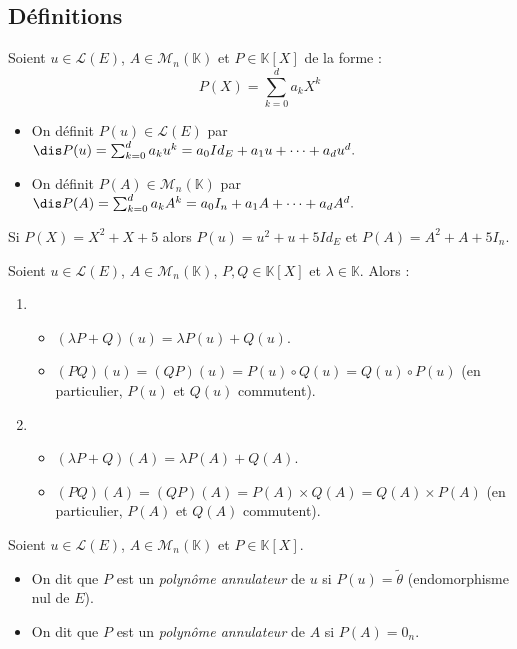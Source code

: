 \documentclass[a4paper,10pt]{report}
\begin{document}
\subsection{Définitions}

\begin{defin} Soient $u \in \mathcal{L}(E)$, $A \in \mathcal{M}_n(\mathbb{K})$ et $P \in \mathbb{K}[X]$ de la forme :
$$ P(X) = \sum_{k=0}^d a_k X^k $$
\begin{itemize}
\item On définit $P(u) \in \mathcal{L}(E)$ par $\dis P(u) = \sum_{k=0}^d a_k u^k = a_0 Id_E + a_1 u + \cdots +a_d u^d.$
\item On définit $P(A) \in \mathcal{M}_n(\mathbb{K})$ par $\dis P(A) = \sum_{k=0}^d a_k A^k = a_0 I_n + a_1 A + \cdots +a_d A^d.$
\end{itemize}
\end{defin}

\begin{ex} Si $P(X) = X^2+X+5$ alors $P(u) = u^2+u+5 Id_E$ et $P(A) = A^2+A+5I_n$.
\end{ex}

\begin{prop} Soient $u \in \mathcal{L}(E)$, $A \in \mathcal{M}_n(\mathbb{K})$, $P,Q \in \mathbb{K}[X]$ et $\lambda \in \mathbb{K}$. Alors :
\begin{enumerate}
\item
\begin{itemize}
\item $(\lambda P + Q)(u) = \lambda P(u) + Q(u)$.
\item $(PQ)(u)=(QP)(u) = P(u) \circ Q(u) = Q(u) \circ P(u)$ (en particulier, $P(u)$ et $Q(u)$ commutent).
\end{itemize}
\item
\begin{itemize}
\item $(\lambda P + Q)(A) = \lambda P(A) + Q(A)$.
\item $(PQ)(A)=(QP)(A) = P(A) \times Q(A) = Q(A) \times P(A)$ (en particulier, $P(A)$ et $Q(A)$ commutent).
\end{itemize}
\end{enumerate}
\end{prop}

\begin{defin} Soient $u \in \mathcal{L}(E)$, $A \in \mathcal{M}_n(\mathbb{K})$ et $P \in \mathbb{K}[X]$. 
\begin{itemize}
\item On dit que $P$ est un \textit{polynôme annulateur} de $u$ si $P(u) = \tilde{\theta}$ (endomorphisme nul de $E$).
\item On dit que $P$ est un \textit{polynôme annulateur} de $A$ si $P(A)=0_n$.
\end{itemize}
\end{defin}
\end{document}
